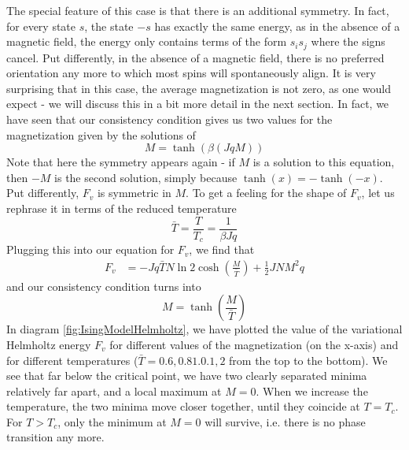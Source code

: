 \documentclass[a4paper, draft]{article}
\theoremstyle{own}
\theoremstyle{remark}
\begin{document}
The special feature of this case is that there is an additional symmetry. In fact, for every state $s$, the state $-s$ has exactly the same energy, as in the absence of a magnetic field, the energy only contains terms of the form $s_i s_j$ where the signs cancel. Put differently, in the absence of a magnetic field, there is no preferred orientation any more to which most spins will spontaneously align. It is very surprising that in this case, the average magnetization is not zero, as one would expect - we will discuss this in a bit more detail in the next section. In fact, we have seen that our consistency condition gives us two values for the magnetization given by the solutions of
$$
M = \tanh(\beta(Jq M))
$$
Note that here the symmetry appears again - if $M$ is a solution to this equation, then $-M$ is the second solution, simply because $\tanh (x) = - \tanh (-x)$. Put differently, $F_v$ is symmetric in $M$. To get a feeling for the shape of $F_v$, let us rephrase it in terms of the reduced temperature 
$$
\bar{T} = \frac{T}{T_c} = \frac{1}{\beta Jq}
$$
Plugging this into our equation for $F_v$, we find that
\begin{align*}
F_v &= - Jq \bar{T}  N \ln 2 \cosh(\frac{M}{\bar{T}} )  + \frac{1}{2} J N M^2 q
\end{align*}
and our consistency condition turns into
$$
M = \tanh(\frac{M}{\bar{T}})
$$
In diagram \ref{fig:IsingModelHelmholtz}, we have plotted the value of the variational Helmholtz energy $F_v$ for different values of the magnetization (on the x-axis) and for different temperatures ($\bar{T} = 0.6, 0.8 1.0. 1,2$ from the top to the bottom). We see that far below the critical point, we have two clearly separated minima relatively far apart, and a local maximum at $M = 0$. When we increase the temperature, the two minima move closer together, until they coincide at $T = T_c$. For $T > T_c$, only the minimum at $M = 0$ will survive, i.e. there is no phase transition any more.
\end{document}
